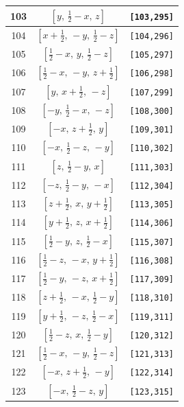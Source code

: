 \documentclass[fleqn,8pt]{jsarticle}
\begin{document}
\begin{longtable}{ccc}
103 & $\left[ y,\, \frac{1}{2} - x,\, z \right]$ & {\tt [103,295]} \\ \hline
104 & $\left[ x + \frac{1}{2},\, - y,\, \frac{1}{2} - z \right]$ & {\tt [104,296]} \\ \hline
105 & $\left[ \frac{1}{2} - x,\, y,\, \frac{1}{2} - z \right]$ & {\tt [105,297]} \\ \hline
106 & $\left[ \frac{1}{2} - x,\, - y,\, z + \frac{1}{2} \right]$ & {\tt [106,298]} \\ \hline
107 & $\left[ y,\, x + \frac{1}{2},\, - z \right]$ & {\tt [107,299]} \\ \hline
108 & $\left[ - y,\, \frac{1}{2} - x,\, - z \right]$ & {\tt [108,300]} \\ \hline
109 & $\left[ - x,\, z + \frac{1}{2},\, y \right]$ & {\tt [109,301]} \\ \hline
110 & $\left[ - x,\, \frac{1}{2} - z,\, - y \right]$ & {\tt [110,302]} \\ \hline
111 & $\left[ z,\, \frac{1}{2} - y,\, x \right]$ & {\tt [111,303]} \\ \hline
112 & $\left[ - z,\, \frac{1}{2} - y,\, - x \right]$ & {\tt [112,304]} \\ \hline
113 & $\left[ z + \frac{1}{2},\, x,\, y + \frac{1}{2} \right]$ & {\tt [113,305]} \\ \hline
114 & $\left[ y + \frac{1}{2},\, z,\, x + \frac{1}{2} \right]$ & {\tt [114,306]} \\ \hline
115 & $\left[ \frac{1}{2} - y,\, z,\, \frac{1}{2} - x \right]$ & {\tt [115,307]} \\ \hline
116 & $\left[ \frac{1}{2} - z,\, - x,\, y + \frac{1}{2} \right]$ & {\tt [116,308]} \\ \hline
117 & $\left[ \frac{1}{2} - y,\, - z,\, x + \frac{1}{2} \right]$ & {\tt [117,309]} \\ \hline
118 & $\left[ z + \frac{1}{2},\, - x,\, \frac{1}{2} - y \right]$ & {\tt [118,310]} \\ \hline
119 & $\left[ y + \frac{1}{2},\, - z,\, \frac{1}{2} - x \right]$ & {\tt [119,311]} \\ \hline
120 & $\left[ \frac{1}{2} - z,\, x,\, \frac{1}{2} - y \right]$ & {\tt [120,312]} \\ \hline
121 & $\left[ \frac{1}{2} - x,\, - y,\, \frac{1}{2} - z \right]$ & {\tt [121,313]} \\ \hline
122 & $\left[ - x,\, z + \frac{1}{2},\, - y \right]$ & {\tt [122,314]} \\ \hline
123 & $\left[ - x,\, \frac{1}{2} - z,\, y \right]$ & {\tt [123,315]} \\ \hline

\end{longtable}
\end{document}
